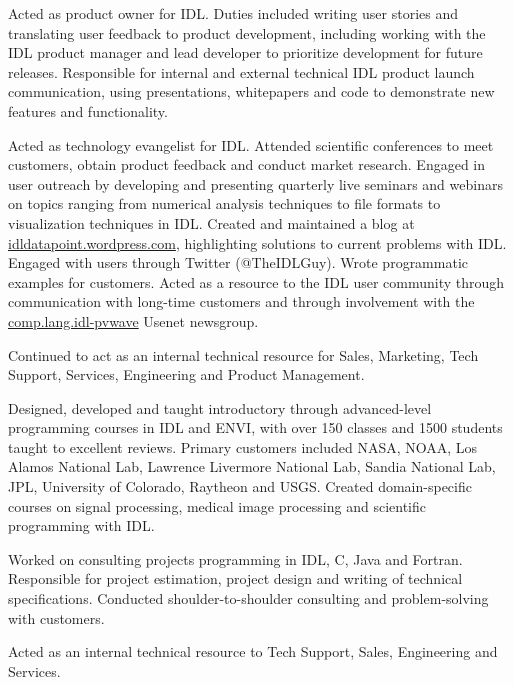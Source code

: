 \documentclass[letterpaper]{resume}
\begin{document}
\begin{compactitem}[\itembullet]
  \item Acted as product owner for IDL. Duties included writing user
    stories and translating user feedback to product development,
    including working with the IDL product manager and lead developer
    to prioritize development for future releases. Responsible for
    internal and external technical IDL product launch communication,
    using presentations, whitepapers and code to demonstrate new
    features and functionality.
  \item Acted as technology evangelist for IDL. Attended scientific
    conferences to meet customers, obtain product feedback and conduct
    market research. Engaged in user outreach by developing and
    presenting quarterly live seminars and webinars on topics ranging
    from numerical analysis techniques to file formats to
    visualization techniques in IDL. Created and maintained a blog at
    {\url{idldatapoint.wordpress.com}}, highlighting solutions
    to current problems with IDL. Engaged with users through Twitter
    (@TheIDLGuy). Wrote programmatic examples for customers. Acted as
    a resource to the IDL user community through communication with
    long-time customers and through involvement with the
    \url{comp.lang.idl-pvwave} Usenet newsgroup.
  \item Continued to act as an internal technical resource for Sales,
    Marketing, Tech Support, Services, Engineering and Product
    Management.
\end{compactitem}

\begin{compactitem}[\itembullet]
  \item Designed, developed and taught introductory through
    advanced-level programming courses in IDL and ENVI, with over 150
    classes and 1500 students taught to excellent reviews. Primary
    customers included NASA, NOAA, Los Alamos National Lab, Lawrence
    Livermore National Lab, Sandia National Lab, JPL, University of
    Colorado, Raytheon and USGS. Created domain-specific courses on
    signal processing, medical image processing and scientific
    programming with IDL.
  \item Worked on consulting projects programming in IDL, C, Java and
    Fortran. Responsible for project estimation, project design and
    writing of technical specifications. Conducted
    shoulder-to-shoulder consulting and problem-solving with
    customers.
  \item Acted as an internal technical resource to Tech Support,
    Sales, Engineering and Services.
\end{compactitem}
\end{document}
